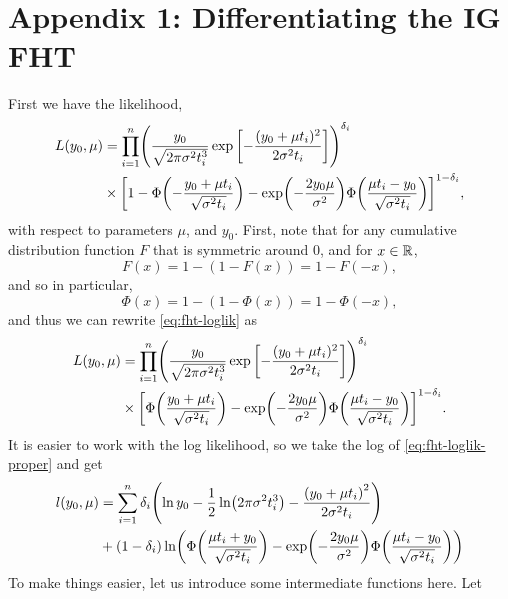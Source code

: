 \chapter{Appendix 1: Differentiating the IG FHT}\label{appendix}
First we have the likelihood,
\begin{align}\label{eq:fht-loglik}
\begin{split}
L(y_0, \mu)&=\prod_{i=1}^n\p*{\frac{y_0}{\sqrt{2\pi\sigma^2\ti^3}}\exp\left[-\frac{(y_0+\mu \ti)^2}{2\sigma^2\ti}\right]}^{\di}\\
&\times\sqb*{1-\Phi\p*{-\frac{y_0+\mu \ti}{\sqrt{\sigma^2\ti}}}-\exp\p*{-\frac{2y_0\mu}{\sigma^2}}\Phi\p*{\frac{\mu \ti-y_0}{\sqrt{\sigma^2\ti}}}}^{1-\di},
\end{split}
\end{align}
with respect to parameters $\mu$, and $y_0$. First, note that for any cumulative distribution function $F$ that is symmetric around 0, and for $x\in\mathbb{R}$,
\begin{equation}
    F(x)=1-(1-F(x))=1-F(-x),
\end{equation}
and so in particular,
\begin{equation}
    \Phi(x)=1-(1-\Phi(x))=1-\Phi(-x),
\end{equation}
and thus we can rewrite \eqref{eq:fht-loglik} as
\begin{align}\label{eq:fht-loglik-proper}
\begin{split}
L(y_0, \mu)&=\prod_{i=1}^n\p*{\frac{y_0}{\sqrt{2\pi\sigma^2\ti^3}}\exp\left[-\frac{(y_0+\mu \ti)^2}{2\sigma^2\ti}\right]}^{\di}\\
&\times\sqb*{\Phi\p*{\frac{y_0+\mu \ti}{\sqrt{\sigma^2\ti}}}-\exp\p*{-\frac{2y_0\mu}{\sigma^2}}\Phi\p*{\frac{\mu \ti-y_0}{\sqrt{\sigma^2\ti}}}}^{1-\di}.
\end{split}
\end{align}
It is easier to work with the log likelihood, so we take the log of \eqref{eq:fht-loglik-proper} and get
\begin{align}
\begin{split}
    l(y_0, \mu)&=\sum_{i=1}^n\di\p*{\ln y_0-\frac{1}{2}\ln\p*{2\pi\sigma^2\ti^3}-\frac{\p*{y_0+\mu\ti}^2}{2\sigma^2\ti}} \\
    &+
    (1-\di)\ln\p*{\Phi\p*{\frac{\mu\ti+y_0}{\sqrt{\sigma^2\ti}}}-\exp\p*{-\frac{2y_0\mu}{\sigma^2}}\Phi\p*{\frac{\mu\ti-y_0}{\sqrt{\sigma^2\ti}}}}
\end{split}
\end{align}
To make things easier, let us introduce some intermediate functions here. Let
